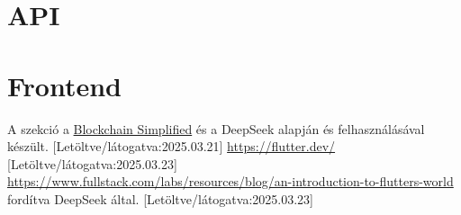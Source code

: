 \documentclass{thesis-ekf}
\theoremstyle{definition}
\theoremstyle{remark}
\begin{document}
	\chapter{API}
	\label{ch_API}
	
	\chapter{Frontend}
\begin{thebibliography}{8}
	A szekció a \href{https://blockchainsimplified.com/blog/mongodb-introduction/}{Blockchain Simplified} és a DeepSeek alapján és felhasználásával készült.
	[Letöltve/látogatva:2025.03.21]
	\url{https://flutter.dev/}
	[Letöltve/látogatva:2025.03.23]
	\url{https://www.fullstack.com/labs/resources/blog/an-introduction-to-flutters-world} fordítva DeepSeek által.
	[Letöltve/látogatva:2025.03.23]
\end{thebibliography}
\end{document}
